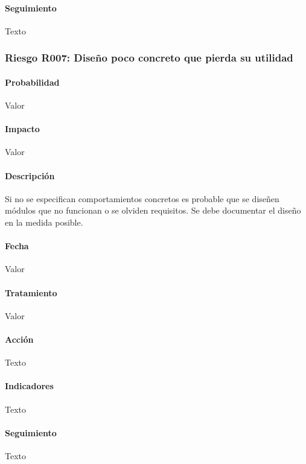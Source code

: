 \documentclass[10pt,a4paper]{article}
\begin{document}
				\paragraph{Seguimiento}	Texto %
				
				\subsubsection{Riesgo R007: Diseño poco concreto que pierda su utilidad}
				\paragraph{Probabilidad} Valor
				\paragraph{Impacto}	Valor
				\paragraph{Descripción} Si no se especifican comportamientos concretos es probable que se diseñen módulos que no funcionan o se olviden requisitos. Se debe documentar el diseño en la medida posible.
				\paragraph{Fecha} Valor %
				\paragraph{Tratamiento} Valor %
				\paragraph{Acción} Texto %
				\paragraph{Indicadores} Texto %
				\paragraph{Seguimiento}	Texto %
				
\end{document}
